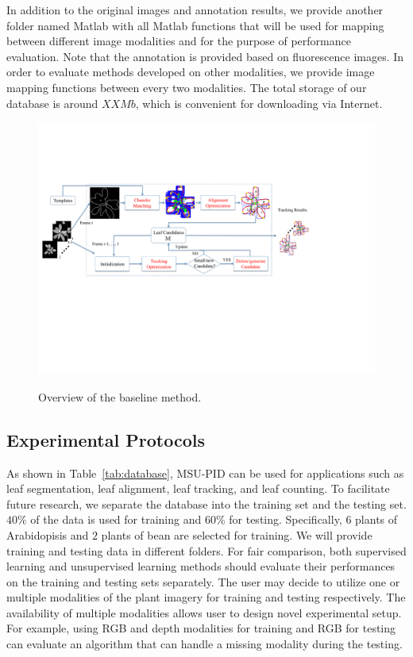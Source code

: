 In addition to the original images and annotation results, we provide another folder named Matlab with all Matlab functions that will be used for mapping between different image modalities and for the purpose of performance evaluation.
Note that the annotation is provided based on fluorescence images.
In order to evaluate methods developed on other modalities, we provide image mapping functions between every two modalities.
The total storage of our database is around $XX Mb$, which is convenient for downloading via Internet.

\begin{figure}[t!]
\centering
\includegraphics[width=.98\textwidth]{Figures/overview}\\
\caption{Overview of the baseline method.}
\label{fig:methodOverview}
\end{figure}

\subsection{Experimental Protocols}

As shown in Table~\ref{tab:database}, MSU-PID can be used for applications such as leaf segmentation, leaf alignment, leaf tracking, and leaf counting.
To facilitate future research, we separate the database into the training set and the testing set.
$40\%$ of the data is used for training and $60\%$ for testing.
Specifically, $6$ plants of Arabidopisis and $2$ plants of bean are selected for training.
We will provide training and testing data in different folders.
For fair comparison, both supervised learning and unsupervised learning methods should evaluate their performances on the training and testing sets separately.
The user may decide to utilize one or multiple modalities of the plant imagery for training and testing respectively.
The availability of multiple modalities allows user to design novel experimental setup.
For example, using RGB and depth modalities for training and RGB for testing can evaluate an algorithm that can handle a missing modality during the testing.




